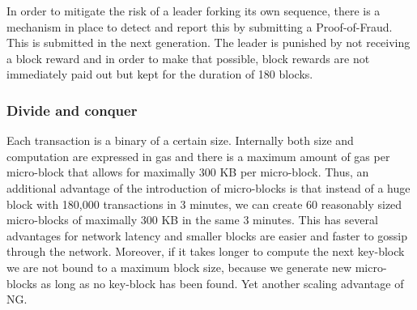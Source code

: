 In order to mitigate the risk of a leader forking its own sequence,
there is a mechanism in place to detect and report this by submitting
a Proof-of-Fraud. This is submitted in the next
generation. The leader is punished by not receiving a block reward and
in order to make that possible, block rewards are not immediately paid out but kept for
the duration of 180 blocks.

\subsubsection{Divide and conquer}

Each transaction is a binary of a certain size. Internally both size
and computation are expressed in gas and there is a maximum amount of
gas per micro-block that allows for maximally 300 KB per micro-block.
Thus, an additional advantage of the introduction of micro-blocks is that
instead of a huge block with 180,000 transactions in 3 minutes, we can create 60
reasonably sized micro-blocks of maximally 300 KB  in the same 3
minutes. This has several advantages for network latency and
smaller blocks are easier and faster to gossip through the
network. Moreover, if it takes longer to compute the next key-block we
are not bound to a maximum block size, because we generate new
micro-blocks as long as no key-block has been found. Yet another
scaling advantage of NG.
